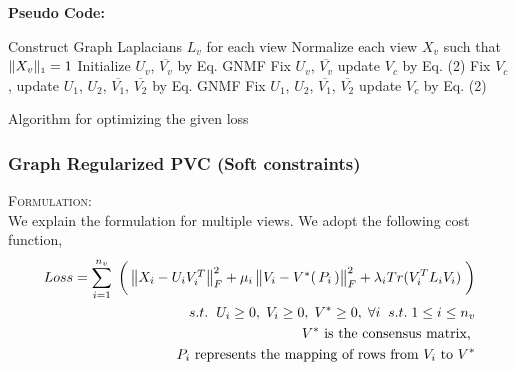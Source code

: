 \documentclass[a4paper]{article}
\begin{document}
	\noindent
	\textbf{Pseudo Code:}
	\begin{algorithm}
		Construct Graph Laplacians $L_{v}$ for each view\;
		Normalize each view $X_{v}$ such that $\|X_{v}\|_{\text{\tiny1}} = 1 $\;
		Initialize  $U_{v}$, $\overline{V_{v}}$ by Eq. GNMF\;
		Fix $U_{v}$, $\overline{V_{v}}$ update $V_{c}$ by Eq. (2)\;		
		{
			{
				Fix $V_{c}$, update $U_{1}$, $U_{2}$, $\overline{V_{1}}$, $\overline{V_{2}}$ by Eq. GNMF\;
			}
			Fix $U_{1}$, $U_{2}$, $\overline{V_{1}}$, $\overline{V_{2}}$ update $V_{c}$ by Eq. (2)\;
		}						
		\caption{Algorithm for optimizing the given loss}
	\end{algorithm}

	\subsubsection{Graph Regularized PVC (Soft constraints)}
	
	\textsc{Formulation:}\\
	We explain the formulation for multiple views. We adopt the following cost function,
	\begin{align*}	
	Loss = \displaystyle\sum_{i=1}^{n_{v}} \; \bigg(\begin{Vmatrix} X_{i}-U_{i}V^{T}_{i} \end{Vmatrix}^{2}_{F}	
		+ \mu_{i}\begin{Vmatrix} V_{i}-V^{*}(\, P_{i} \, ) \end{Vmatrix}^{2}_{F}
		+ \lambda_{i}Tr(V^{T}_{i}L_{i}V_{i}) \; \bigg)\\	
		s.t. \hspace{2mm}  U_{i}\geq0,\;V_{i}\geq0,\;V^{*}\geq0,\;\forall i \;\;s.t.\; 1 \leq i \leq n_{v}\\
		V^{*} \text{ is the consensus matrix, } \\
		P_{i} \text{ represents the mapping of rows from } V_{i} \text{ to } V^{*}
	\end{align*}	
\end{document}
